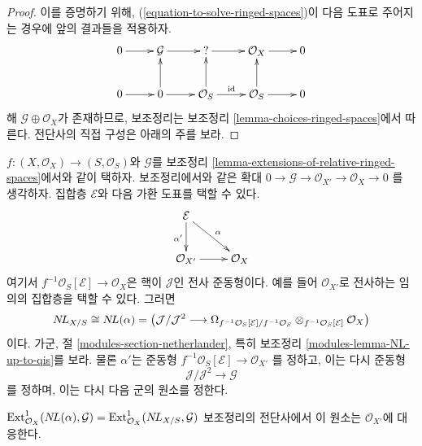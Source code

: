 \begin{proof}
이를 증명하기 위해, (\ref{equation-to-solve-ringed-spaces})이 다음
도표로 주어지는 경우에 앞의 결과들을 적용하자.
$$
\xymatrix{
0 \ar[r] &
\mathcal{G} \ar[r] &
{?} \ar[r] &
\mathcal{O}_X \ar[r] & 0 \\
0 \ar[r] &
0 \ar[u] \ar[r] &
\mathcal{O}_S \ar[u] \ar[r]^{\text{id}} &
\mathcal{O}_S \ar[u] \ar[r] & 0
}
$$
해 $\mathcal{G} \oplus \mathcal{O}_X$가 존재하므로, 보조정리는
보조정리 \ref{lemma-choices-ringed-spaces}에서 따른다. 전단사의 직접
구성은 아래의 주를 보라.
\end{proof}

\begin{remark}
\label{remark-extensions-of-relative-ringed-spaces}
$f : (X, \mathcal{O}_X) \to (S, \mathcal{O}_S)$와 $\mathcal{G}$를
보조정리 \ref{lemma-extensions-of-relative-ringed-spaces}에서와 같이
택하자. 보조정리에서와 같은 확대
$0 \to \mathcal{G} \to \mathcal{O}_{X'} \to \mathcal{O}_X \to 0$
를 생각하자. 집합층 $\mathcal{E}$와 다음 가환 도표를 택할 수 있다.
$$
\xymatrix{
\mathcal{E} \ar[d]_{\alpha'} \ar[rd]^\alpha \\
\mathcal{O}_{X'} \ar[r] & \mathcal{O}_X
}
$$
여기서 $f^{-1}\mathcal{O}_S[\mathcal{E}] \to \mathcal{O}_X$은 핵이
$\mathcal{J}$인 전사 준동형이다. 예를 들어
$\mathcal{O}_{X'}$로 전사하는 임의의 집합층을 택할 수 있다. 그러면
$$
\mathop{N\!L}\nolimits_{X/S} \cong \mathop{N\!L}\nolimits(\alpha) = 
\left(
\mathcal{J}/\mathcal{J}^2
\longrightarrow
\Omega_{f^{-1}\mathcal{O}_S[\mathcal{E}]/f^{-1}\mathcal{O}_S}
\otimes_{f^{-1}\mathcal{O}_S[\mathcal{E}]} \mathcal{O}_X\right)
$$
이다. 가군, 절 \ref{modules-section-netherlander}, 특히 보조정리
\ref{modules-lemma-NL-up-to-qis}를 보라. 물론 $\alpha'$는 준동형
$f^{-1}\mathcal{O}_S[\mathcal{E}] \to \mathcal{O}_{X'}$
를 정하고, 이는 다시 준동형
$$
\mathcal{J}/\mathcal{J}^2 \longrightarrow \mathcal{G}
$$
를 정하며, 이는 다시 다음 군의 원소를 정한다.\par\noindent
$\mathop{\mathrm{Ext}}\nolimits^1_{\mathcal{O}_X}(\mathop{N\!L}\nolimits(\alpha), \mathcal{G}) =
\mathop{\mathrm{Ext}}\nolimits^1_{\mathcal{O}_X}(\mathop{N\!L}\nolimits_{X/S}, \mathcal{G})$
보조정리의 전단사에서 이 원소는 $\mathcal{O}_{X'}$에 대응한다.
\end{remark}

